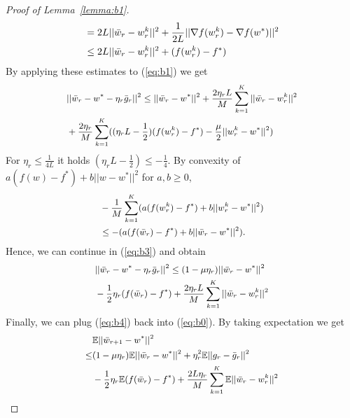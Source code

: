 \begin{proof}[Proof of Lemma~\ref{lemma:b1}]
\begin{equation}
\begin{split}
    &=2L||\Bar{w}_r-w_r^k||^2+\frac{1}{2L}||\nabla f(w_r^k)-\nabla f(w^*)||^2\\
    &\leq2L||\Bar{w}_r-w_r^k||^2+(f(w_r^k)-f^*)
\end{split}
\end{equation}
By applying these estimates to (\ref{eq:b1}) we get
\begin{equation}
\small
\label{eq:b3}
    \begin{split}
        &||\Bar{w}_r-w^*-\eta_r\Bar{g}_r||^2\leq||\Bar{w}_r-w^*||^2+\frac{2\eta_rL}{M}\sum_{k=1}^K||\Bar{w}_r-w_r^k||^2\\
        &+\frac{2\eta_r}{M}\sum_{k=1}^K((\eta_rL-\frac{1}{2})(f(w_r^k)-f^*)-\frac{\mu}{2}||w_r^k-w^*||^2)
    \end{split}
\end{equation}
For $\eta_r\leq \frac{1}{4L}$ it holds $(\eta_rL-\frac{1}{2})\leq -\frac{1}{4}$. By convexity of $a(f(w)-f^*)+b||w-w^*||^2$ for $a,b\geq0$,
\begin{equation}
\small
    \begin{split}
        &-\frac{1}{M}\sum_{k=1}^K(a(f(w_r^k)-f^*)+b||w_r^k-w^*||^2)\\
        &\leq-(a(f(\Bar{w}_r)-f^*)+b||\Bar{w}_r-w^*||^2).
    \end{split}
\end{equation}
Hence, we can continue in (\ref{eq:b3}) and obtain
\begin{equation}
\small
\label{eq:b4}
    \begin{split}
        &||\Bar{w}_r-w^*-\eta_r\Bar{g}_r||^2\leq(1-\mu\eta_r)||\Bar{w}_r-w^*||^2\\
        &-\frac{1}{2}\eta_r(f(\Bar{w}_r)-f^*)+\frac{2\eta_rL}{M}\sum_{k=1}^K||\Bar{w}_r-w_r^k||^2
    \end{split}
\end{equation}
Finally, we can plug (\ref{eq:b4}) back into (\ref{eq:b0}). By taking expectation we get 
\begin{equation}
\label{eq:b5}
\small
\begin{split}
    &\mathbb{E}||\Bar{w}_{r+1}-w^*||^2\\
    \leq&(1-\mu\eta_r)\mathbb{E}||\Bar{w}_r-w^*||^2+\eta_r^2\mathbb{E}||g_r-\Bar{g}_r||^2\\
    &-\frac{1}{2}\eta_r\mathbb{E}(f(\Bar{w}_r)-f^*)+\frac{2L\eta_r }{M}\sum_{k=1}^K\mathbb{E}||\Bar{w}_r-w_{r}^{k}||^2
\end{split}
\end{equation}
\end{proof}











